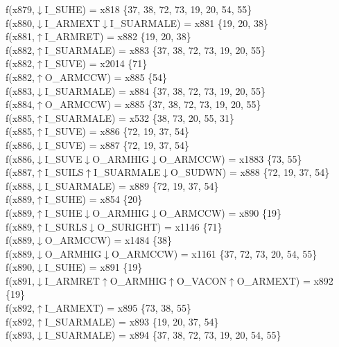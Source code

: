 f(x879,$\downarrow$I\_SUHE) = x818 \{37, 38, 72, 73, 19, 20, 54, 55\} \\  
f(x880,$\downarrow$I\_ARMEXT$\downarrow$I\_SUARMALE) = x881 \{19, 20, 38\} \\  
f(x881,$\uparrow$I\_ARMRET) = x882 \{19, 20, 38\} \\  
f(x882,$\uparrow$I\_SUARMALE) = x883 \{37, 38, 72, 73, 19, 20, 55\} \\  
f(x882,$\uparrow$I\_SUVE) = x2014 \{71\} \\  
f(x882,$\uparrow$O\_ARMCCW) = x885 \{54\} \\  
f(x883,$\downarrow$I\_SUARMALE) = x884 \{37, 38, 72, 73, 19, 20, 55\} \\  
f(x884,$\uparrow$O\_ARMCCW) = x885 \{37, 38, 72, 73, 19, 20, 55\} \\  
f(x885,$\uparrow$I\_SUARMALE) = x532 \{38, 73, 20, 55, 31\} \\  
f(x885,$\uparrow$I\_SUVE) = x886 \{72, 19, 37, 54\} \\  
f(x886,$\downarrow$I\_SUVE) = x887 \{72, 19, 37, 54\} \\  
f(x886,$\downarrow$I\_SUVE$\downarrow$O\_ARMHIG$\downarrow$O\_ARMCCW) = x1883 \{73, 55\} \\  
f(x887,$\uparrow$I\_SUILS$\uparrow$I\_SUARMALE$\downarrow$O\_SUDWN) = x888 \{72, 19, 37, 54\} \\  
f(x888,$\downarrow$I\_SUARMALE) = x889 \{72, 19, 37, 54\} \\  
f(x889,$\uparrow$I\_SUHE) = x854 \{20\} \\  
f(x889,$\uparrow$I\_SUHE$\downarrow$O\_ARMHIG$\downarrow$O\_ARMCCW) = x890 \{19\} \\  
f(x889,$\uparrow$I\_SURLS$\downarrow$O\_SURIGHT) = x1146 \{71\} \\  
f(x889,$\downarrow$O\_ARMCCW) = x1484 \{38\} \\  
f(x889,$\downarrow$O\_ARMHIG$\downarrow$O\_ARMCCW) = x1161 \{37, 72, 73, 20, 54, 55\} \\  
f(x890,$\downarrow$I\_SUHE) = x891 \{19\} \\  
f(x891,$\downarrow$I\_ARMRET$\uparrow$O\_ARMHIG$\uparrow$O\_VACON$\uparrow$O\_ARMEXT) = x892 \{19\} \\  
f(x892,$\uparrow$I\_ARMEXT) = x895 \{73, 38, 55\} \\  
f(x892,$\uparrow$I\_SUARMALE) = x893 \{19, 20, 37, 54\} \\  
f(x893,$\downarrow$I\_SUARMALE) = x894 \{37, 38, 72, 73, 19, 20, 54, 55\} \\  
